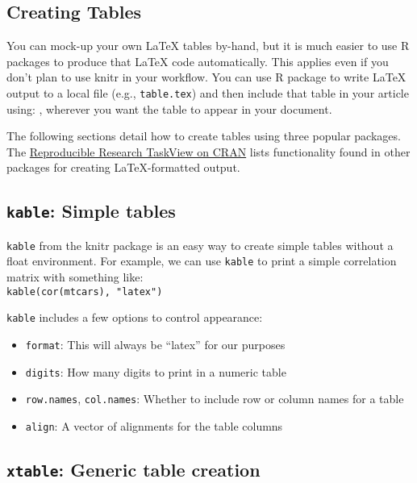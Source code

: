\documentclass[11pt, a4paper]{article}
\begin{document}
\subsection*{Creating Tables}

You can mock-up your own \LaTeX{} tables by-hand, but it is much easier to use R packages to produce that \LaTeX{} code automatically. This applies even if you don't plan to use knitr in your workflow. You can use R package to write \LaTeX{} output to a local file (e.g., \texttt{table.tex}) and then include that table in your article using: \verb||, wherever you want the table to appear in your document.

\vspace{1em}
\noindent The following sections detail how to create tables using three popular packages. The \href{http://cran.r-project.org/web/views/ReproducibleResearch.html}{Reproducible Research TaskView on CRAN} lists functionality found in other packages for creating \LaTeX{}-formatted output.

\clearpage
\subsection*{\texttt{kable}: Simple tables}

\texttt{kable} from the knitr package is an easy way to create simple tables without a float environment. For example, we can use \texttt{kable} to print a simple correlation matrix with something like:\\
\verb|kable(cor(mtcars), "latex")|

\noindent \texttt{kable} includes a few options to control appearance:
\begin{itemize}
\item \texttt{format}: This will always be ``latex'' for our purposes
\item \texttt{digits}: How many digits to print in a numeric table
\item \texttt{row.names}, \texttt{col.names}: Whether to include row or column names for a table
\item \texttt{align}: A vector of alignments for the table columns
\end{itemize}

\vspace{1em}
\subsection*{\texttt{xtable}: Generic table creation}
\end{document}

